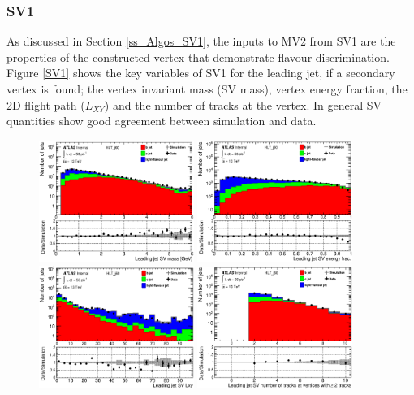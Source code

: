 \documentclass[12pt, onecolumn,notitlepage]{article}
\begin{document}
\subsubsection{SV1}

As discussed in Section \ref{ss_Algos_SV1}, the inputs to MV2 from SV1 are the properties of the constructed vertex that demonstrate flavour discrimination.
Figure \ref{SV1} shows the key variables of SV1 for the leading jet, if a secondary vertex is found; the vertex invariant mass (SV mass), vertex energy fraction, the 2D flight path ($L_{XY}$) 
and the number of tracks at the vertex. In general SV quantities show good agreement between simulation and data.

\begin{figure}[!htb]
         \vspace{-0.2cm}
	 \includegraphics[width=0.45\textwidth]{plots/LeadingJet/sv1_m.eps}
	 \includegraphics[width=0.45\textwidth]{plots/LeadingJet/sv1_efc.eps}\\
         \includegraphics[width=0.45\textwidth]{plots/LeadingJet/sv1_Lxy.eps}
         \includegraphics[width=0.45\textwidth]{plots/LeadingJet/sv1_ntrkv.eps}

\end{figure}
\end{document}

